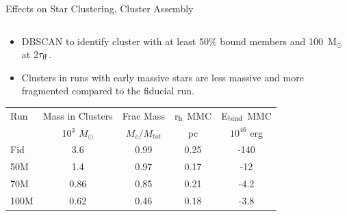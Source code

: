 \documentclass[aspectratio=169]{beamer}
\begin{document}
\begin{frame}{Effects on Star Clustering, Cluster Assembly}{}
\begin{columns}
\begin{column}{0.45\textwidth}
            \begin{itemize}
              \item DBSCAN to identify cluster with at least 50\% bound members and 100~M$_\odot$ at 2$\tau_{\rm ff}$.
              \item Clusters in runs with early massive stars are less massive and more fragmented compared to the fiducial run.  
            \end{itemize}
	    \begin{table}[!htb]
            	\tiny
 		\label{tab:cluster_stats_2tff}
 		\begin{tabular}{lcccc} 
  			\hline
  			Run & Mass in Clusters & Frac Mass & r$_{\rm h}$ MMC & E$_{\rm bind}$ MMC \\
  			& 10$^3$ $M_{\odot}$ & $M_{c}/M_{tot}$ & pc & $10^{46}$ erg\\
  			\hline
  			Fid & 3.6 & 0.99 & 0.25 & -140 \\
  			50M & 1.4 & 0.97 & 0.17 & -12 \\
  			70M & 0.86 & 0.85 & 0.21 & -4.2 \\
  			100M & 0.62 & 0.46 & 0.18 & -3.8 \\
  			\hline
 		\end{tabular}
	    \end{table}
        \end{column}
    \end{columns}
\end{frame} 
\end{document}
